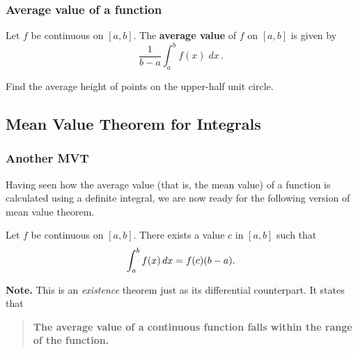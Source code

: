 \documentclass[10pt,t,handout,ignorenonframetext,aspectratio=169]{beamer}
\begin{document}
\begin{frame}
  \frametitle{Average value of a function}
  \begin{defn}
    Let $f$ be continuous on $[a,b]$. The \textbf{average value} of $f$
    on $[a,b]$ is given by
    \[
      \frac{1}{b-a} \int_a^b	f(x) \; dx \,.
    \]
  \end{defn}
\end{frame}

\begin{frame}
  \vs
  \begin{example}
    Find the average height of points on the upper-half unit circle.
  \end{example}
  \vs
  \hfill
  \begin{minipage}{0.4\linewidth}
    \begin{image}[0.9\linewidth]
    \end{image}
  \end{minipage}
\end{frame}


\subsection{Mean Value Theorem for Integrals}
\begin{frame}
  \frametitle{Another MVT}
  Having seen how the average value (that is, the mean value) of a
  function is calculated using a definite integral, we are now ready
  for the following version of mean value theorem.

  \begin{thm}
    Let $f$ be continuous on $[a,b]$. There exists a value $c$ in $[a,b]$
    such that
    \[
      \int_a^bf(x)\mathop{}\!d x = f(c)(b-a).
    \]
  \end{thm}

  \textbf{Note.} This is an \textit{existence} theorem just as its
  differential counterpart. It states that
  \begin{quote}
    \textbf{The average value of a continuous function falls within the
      range of the function.}
  \end{quote}
\end{frame}
\end{document}
